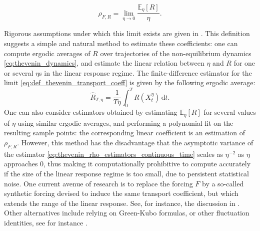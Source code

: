 \documentclass[pdflatex,sn-mathphys]{sn-jnl}%
\theoremstyle{thmstyleone}%
\theoremstyle{thmstyletwo}%
\theoremstyle{thmstylethree}%
\renewcommand{\d}{\mathrm{d}}
\newcommand{\1}{\mathbbm{1}}
\begin{document}
\begin{equation}
    \label{eq:def_thevenin_transport_coeff}
    \rho_{F,R} = \underset{\eta\to 0}{\lim}\frac{\mathbb{E}_{\eta}\left[R\right]}{\eta}.
\end{equation}

Rigorous assumptions under which this limit exists are given in \cite{hairer_simple_2010}. This definition suggests a simple and natural method to estimate these coefficients: one can compute ergodic averages of $R$ over trajectories of the non-equilibrium dynamics \eqref{eq:thevenin_dynamics}, and estimate the linear relation between $\eta$ and $R$ for one or several $\eta$s in the linear response regime. The finite-difference estimator for the limit \eqref{eq:def_thevenin_transport_coeff} is given by the following ergodic average:
\begin{equation}
    \label{eq:thevenin_rho_estimators_continuous_time}
    \widehat{R}_{T,\eta}=\frac1{T\eta}\int_0^T R(X^\eta_t)\,\d t.
\end{equation}
One can also consider estimators obtained by estimating $\mathbb{E}_\eta[R]$ for several values of $\eta$ using similar ergodic averages, and performing a polynomial fit on the resulting sample points: the corresponding linear coefficient is an estimation of $\rho_{F,R}$.
However, this method has the disadvantage that the asymptotic variance of the estimator \eqref{eq:thevenin_rho_estimators_continuous_time} scales as $\eta^{-2}$ as $\eta$ approaches $0$, thus making it computationally prohibitive to compute accurately if the size of the linear response regime is too small, due to persistent statistical noise. One current avenue of research is to replace the forcing $F$ by a so-called synthetic forcing devised to induce the same transport coefficient, but which extends the range of the linear response. See, for instance, the discussion in \cite[Section 6.1]{evans_statistical_2008}. Other alternatives 
include relying on Green-Kubo formulas, or other fluctuation identities, see for instance \cite{plechac_convergence_2021}. 
\end{document}

